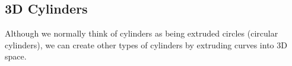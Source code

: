 \subsection{3D Cylinders}
\noindent
Although we normally think of cylinders as being extruded circles (circular cylinders), we can create other types of cylinders by extruding curves into 3D space.


